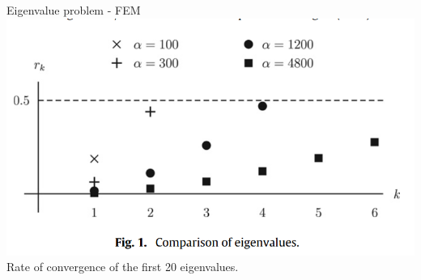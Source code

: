 \documentclass[8pt]{beamer}
\begin{document}
        \begin{frame}{Eigenvalue problem - FEM}
            \centering
            \includegraphics[scale=0.45]{Result.png} \\ %
            \footnotesize Rate of convergence of the first 20 eigenvalues.
            \label{fig:conv}
        \end{frame}
        
\end{document}
